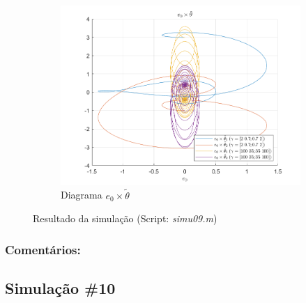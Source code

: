 \documentclass[10pt]{article}
\begin{document}
\begin{figure}[h!]
    \begin{subfigure}[b]{0.3\textwidth}
        \centering
        \includegraphics[width=\textwidth]{img/fig09d.png}
        \caption{Diagrama $e_0 \times \tilde{\theta}$}
    \end{subfigure}

    \caption{Resultado da simulação (Script: \textit{simu09.m})}
    \label{fig:sim9}
\end{figure}

\subsubsection{Comentários:}

\newpage

\subsection{Simulação \#10}
\end{document}

